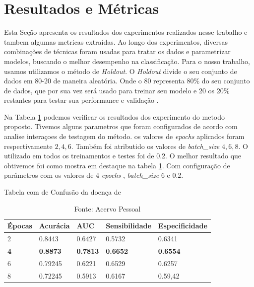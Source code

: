 \documentclass[openright]{UFRGS} %
\begin{document}
\section{Resultados e Métricas}

Esta Seção apresenta os resultados dos experimentos  realizados
nesse trabalho e tambem algumas metricas extraídas. Ao longo dos experimentos, diversas combinações de técnicas foram usadas para tratar os dados e parametrizar modelos, buscando o melhor desempenho na classificação. Para o nosso trabalho, usamos utilizamos o método de \textit{Holdout}. O \textit{Holdout}  divide o seu conjunto de dados em 80-20 de maneira aleatória. Onde o 80 representa 80\% do seu conjunto de dados, que por sua vez será usado para treinar seu modelo e 20 os 20\% restantes para testar sua performance e validação \cite{kim2009estimating}.

Na Tabela \ref{results}  podemos verificar os resultados dos experimento do metodo proposto.
Tivemos alguns parametros que foram configurados de acordo com analise interaçoes de testagem do método. os  valores de \textit{epochs} aplicados foram respectivamente  $2,4,6$. Também foi atributido os valores de  \textit{batch\_size}  $4,6,8$. O  utilizado em todos os treinamentos e testes foi de 0.2. O melhor resultado que obtivemos foi como mostra em destaque na tabela \ref{results}. Com configuração de parâmetros com os valores de  4  \textit{epochs} , \textit{batch\_size} 6 e  0.2. 



\begin{table}[h]
 \begin{center}
 \caption{Tabela com  de Confusão da doença de }
\begin{tabular}{|l|l|l|l|l|}
\hline
Épocas & Acurácia & AUC    & Sensibilidade & Especificidade \\ \hline
2     & 0.8443    &  0.6427    &  0.5732                & 0.6341                \\ \hline
\textbf{4 }    & \textbf{0.8873}    & \textbf{0.7813} & \textbf{0.6652}        & \textbf{0.6554}         \\ \hline
6     & 0.79245   & 0.6221       &    0.6529           &     0.6257            \\ \hline

8    & 0.72245   & 0.5913       &    0.6167           &     0.59,42            \\ \hline
\end{tabular}
   \label{results}
\end{center}
\caption{Fonte: Acervo Pessoal}
\end{table}
\end{document}
